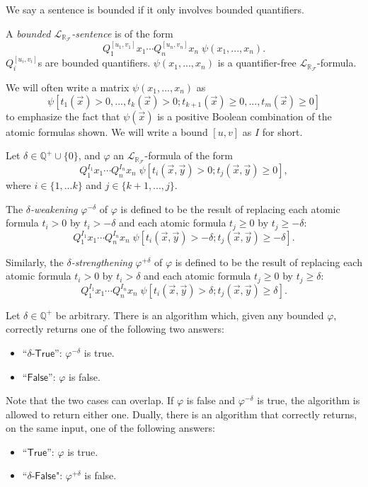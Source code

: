 \documentclass[envcountsect]{llncs}
\newcommand{\lrf}{\mathcal{L}_{\mathbb{R}_{\mathcal{F}}}}
\begin{document}
We say a sentence is bounded if it only involves bounded quantifiers.
\begin{definition}[Bounded $\lrf$-Sentences]
A {\em bounded $\lrf$-sentence} is of the form
$$Q_1^{[u_1,v_1]}x_1\cdots Q_n^{[u_n,v_n]}x_n\;\psi(x_1,...,x_n).$$
$Q_i^{[u_i,v_i]}$s are bounded quantifiers. $\psi(x_1,...,x_n)$ is a
quantifier-free $\lrf$-formula.
\end{definition}
We will often write a matrix $\psi(x_1,...,x_n)$ as
$$\psi[t_1(\vec x)>0,...,t_k(\vec x)>0; t_{k+1}(\vec x)\geq 0,...,t_m(\vec
x)\geq 0]$$ to emphasize the fact that $\psi(\vec x)$ is a positive Boolean
combination of the atomic formulas shown. We will write a bound $[u,v]$ as $I$
for short.
\begin{definition}
Let $\delta\in \mathbb{Q}^+\cup\{0\}$, and $\varphi$ an
$\lrf$-formula of the form
$$Q_1^{I_1}x_1\cdots Q_n^{I_n}x_n\;\psi[t_i(\vec x, \vec y)>0; t_j(\vec x, \vec
y)\geq 0],$$ where $i\in\{1,...k\}$ and $j\in\{k+1,...,j\}$.

The {\em $\delta$-weakening} $\varphi^{-\delta}$ of $\varphi$ is
defined to  be the result of replacing each atomic formula $t_i > 0$ by $t_i >
-\delta$ and each atomic formula $t_j \geq 0$ by $t_j \geq -\delta$:
$$Q_1^{I_1}x_1\cdots Q_n^{I_n}x_n\;\psi[t_i(\vec x, \vec y)>-\delta; t_j(\vec x,
\vec y)\geq -\delta].$$

Similarly, the {\em $\delta$-strengthening} $\varphi^{+\delta}$ of $\varphi$ is
defined to be the result of replacing each atomic formula $t_i > 0$ by $t_i >
\delta$ and each atomic formula $t_j \geq 0$ by $t_j \geq \delta$:
$$Q_1^{I_1}x_1\cdots Q_n^{I_n}x_n\;\psi[t_i(\vec x, \vec y)>\delta; t_j(\vec x,
\vec y)\geq \delta].$$
\end{definition}
\begin{theorem} Let $\delta\in\mathbb{Q}^+$ be
arbitrary. There is an algorithm which, given any bounded $\varphi$,
correctly returns one of the following two answers:
\begin{itemize}
\item ``$\delta$-$\mathsf{True}$'': $\varphi^{-\delta}$ is true.
\item ``$\mathsf{False}$'': $\varphi$ is false.
\end{itemize}
Note that the two cases can overlap. If $\varphi$ is false and
$\varphi^{-\delta}$ is true, the algorithm is allowed to return either
one. Dually, there is an algorithm that correctly returns, on the same input,
one of the following answers:
\begin{itemize}
\item ``$\mathsf{True}$'': $\varphi$ is true.
\item ``$\delta$-$\mathsf{False}$": $\varphi^{+\delta}$ is false.
\end{itemize}
\end{theorem}
\end{document}
